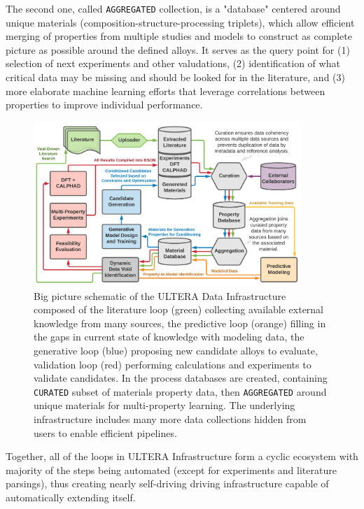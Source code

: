 The second one, called \texttt{AGGREGATED} collection, is a "database" centered around unique materials (composition-structure-processing triplets), which allow efficient merging of properties from multiple studies and models to construct as complete picture as possible around the defined alloys. It serves as the query point for (1) selection of next experiments and other valudations, (2) identification of what critical data may be missing and should be looked for in the literature, and (3) more elaborate machine learning efforts that leverage correlations between properties to improve individual performance.

\begin{figure}[H]
    \centering
    \includegraphics[width=0.9\textwidth]{ultera/PersepctivePaper_Ecosystem_V6.png}
    \caption{Big picture schematic of the ULTERA Data Infrastructure composed of the literature loop (green) collecting available external knowledge from many sources, the predictive loop (orange) filling in the gaps in current state of knowledge with modeling data, the generative loop (blue) proposing new candidate alloys to evaluate, validation loop (red) performing calculations and experiments to validate candidates. In the process databases are created, containing \texttt{CURATED} subset of materials property data, then \texttt{AGGREGATED} around unique materials for multi-property learning. The underlying infrastructure includes many more data collections hidden from users to enable efficient pipelines.}
    \label{ultera:fig:dataschematic}
\end{figure}

Together, all of the loops in ULTERA Infrastructure form a cyclic ecosystem with majority of the steps being automated (except for experiments and literature parsings), thus creating nearly self-driving driving infrastructure capable of automatically extending itself.


